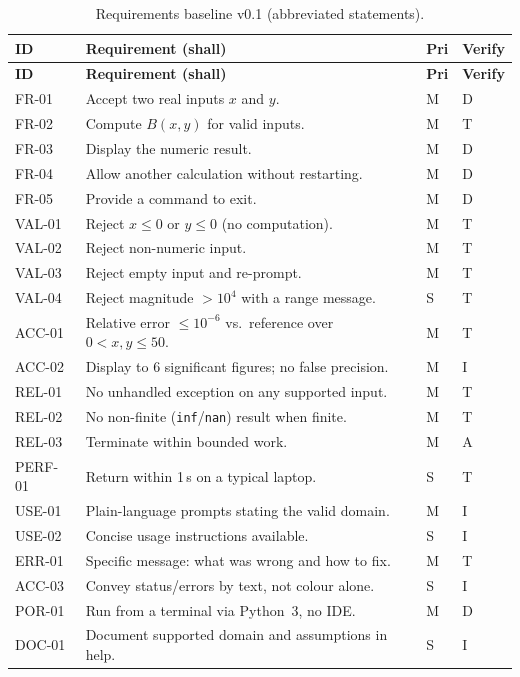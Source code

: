 \documentclass[11pt,a4paper]{article}
\begin{document}
\begin{longtable}{L{1.4cm} L{8.2cm} L{1.0cm} L{1.2cm}}
  \caption{Requirements baseline v0.1 (abbreviated statements).}\label{tab:reqs}\\
  \toprule
  \textbf{ID} & \textbf{Requirement (shall)} & \textbf{Pri} & \textbf{Verify}\\
  \midrule
  \endfirsthead
  \toprule
  \textbf{ID} & \textbf{Requirement (shall)} & \textbf{Pri} & \textbf{Verify}\\
  \midrule
  \endhead
  FR-01  & Accept two real inputs $x$ and $y$. & M & D\\
  FR-02  & Compute $B(x,y)$ for valid inputs. & M & T\\
  FR-03  & Display the numeric result. & M & D\\
  FR-04  & Allow another calculation without restarting. & M & D\\
  FR-05  & Provide a command to exit. & M & D\\
  VAL-01 & Reject $x\le 0$ or $y\le 0$ (no computation). & M & T\\
  VAL-02 & Reject non-numeric input. & M & T\\
  VAL-03 & Reject empty input and re-prompt. & M & T\\
  VAL-04 & Reject magnitude $>10^4$ with a range message. & S & T\\
  ACC-01 & Relative error $\le 10^{-6}$ vs.\ reference over $0<x,y\le 50$. & M & T\\
  ACC-02 & Display to 6 significant figures; no false precision. & M & I\\
  REL-01 & No unhandled exception on any supported input. & M & T\\
  REL-02 & No non-finite (\texttt{inf}/\texttt{nan}) result when finite. & M & T\\
  REL-03 & Terminate within bounded work. & M & A\\
  PERF-01& Return within 1\,s on a typical laptop. & S & T\\
  USE-01 & Plain-language prompts stating the valid domain. & M & I\\
  USE-02 & Concise usage instructions available. & S & I\\
  ERR-01 & Specific message: what was wrong and how to fix. & M & T\\
  ACC-03 & Convey status/errors by text, not colour alone. & S & I\\
  POR-01 & Run from a terminal via Python~3, no IDE. & M & D\\
  DOC-01 & Document supported domain and assumptions in help. & S & I\\
  \bottomrule
\end{longtable}
\end{document}

